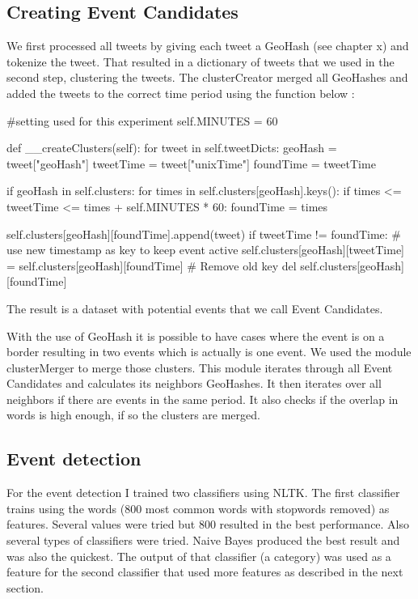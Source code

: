 \documentclass[
10pt, %
a4paper, %
oneside, %
headinclude,footinclude, %
BCOR5mm, %
]{scrartcl}
\begin{document}
\subsection{Creating Event Candidates}
We first processed all tweets by giving each tweet a GeoHash (see chapter x) and tokenize the tweet. That resulted in a dictionary of tweets that we used in the second step, clustering the tweets. The clusterCreator merged all GeoHashes and added the tweets to the correct time period using the function below :
\begin{python}

#setting used for this experiment
self.MINUTES = 60

def __createClusters(self):
        for tweet in self.tweetDicts:
            geoHash = tweet["geoHash"]
            tweetTime = tweet["unixTime"]
            foundTime = tweetTime

            if geoHash in self.clusters:
                for times in self.clusters[geoHash].keys():
                    if times <= tweetTime <= times + self.MINUTES * 60:
                        foundTime = times
            
            self.clusters[geoHash][foundTime].append(tweet)
            if tweetTime != foundTime:
                # use new timestamp as key to keep event active
                self.clusters[geoHash][tweetTime] = self.clusters[geoHash][foundTime]
                # Remove old key
                del self.clusters[geoHash][foundTime] 
\end{python}
The result is a dataset with potential events that we call Event Candidates.

With the use of GeoHash it is possible to have cases where the event is on a border resulting in two events which is actually is one event. We used the module clusterMerger to merge those clusters. This module iterates through all Event Candidates and calculates its neighbors GeoHashes. It then iterates over all neighbors if there are events in the same period. It also checks if the overlap in words is high enough, if so the clusters are merged. 


\subsection{Event detection}
For the event detection I trained two classifiers using NLTK. The first classifier trains using the words (800 most common words with stopwords removed) as features. Several values were tried but 800 resulted in the best performance. Also several types of classifiers were tried. Naive Bayes produced the best result and was also the quickest. The output of that classifier (a category) was used as a feature for the second classifier that used more features as described in the next section.
\newpage
\end{document}
